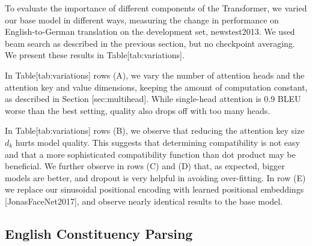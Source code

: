 \documentclass[11pt,a4paper]{article}
\begin{document}
To evaluate the importance of different components of the Transformer, we varied our base model in different ways, measuring the change in performance on English-to-German translation on the development set, newstest2013. We used beam search as described in the previous section, but no checkpoint averaging.  We present these results in Table[tab:variations].

In Table[tab:variations] rows (A), we vary the number of attention heads and the attention key and value dimensions, keeping the amount of computation constant, as described in Section [sec:multihead]. While single-head attention is 0.9 BLEU worse than the best setting, quality also drops off with too many heads.

In Table[tab:variations] rows (B), we observe that reducing the attention key size  $d_k$  hurts model quality. This suggests that determining compatibility is not easy and that a more sophisticated compatibility function than dot product may be beneficial. We further observe in rows (C) and (D) that, as expected, bigger models are better, and dropout is very helpful in avoiding over-fitting.  In row (E) we replace our sinusoidal positional encoding with learned positional embeddings [JonasFaceNet2017], and observe nearly identical results to the base model.

\subsection{English Constituency Parsing}
\end{document}
